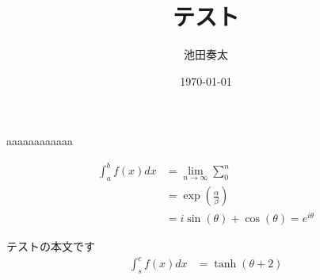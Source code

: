 \documentclass[a4paper]{ltjsarticle}
\title{テスト}
\author{池田奏太}
\date{\today}
\begin{document}
\maketitle



aaaaaaaaaaaa

\begin{align}
  \int_{a}^{b} f(x)dx &= \lim_{n \to \infty}\sum_{0}^{n}\\
  &= \exp \left( \frac{\alpha}{\beta} \right)\\
  &= i \sin(\theta) + \cos(\theta) = e^{i\theta}
\end{align}

テストの本文です
\begin{align}
  \int_{s}^{c} f(x)dx &= \tanh(\theta + 2)
\end{align}
\end{document}
